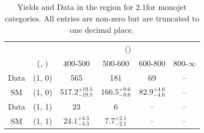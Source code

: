 \begin{table}[h!]
\tiny
\centering
\caption{Yields and Data in the \gj region for 2.1\ifb for monojet categories. All entries are non-zero but are truncated to one decimal place.\label{tab:yieldsall_gj_comb_mono}}
\begin{tabular}
{cccccc}
	\hline\hline
	&	& \multicolumn{4}{c}{\scalht (\gev)}\\ 
	&	 (\njet, \nb) & 400-500 & 500-600 & 600-800 & 800-$\infty$ \\ [0.8ex] 
\hline
	Data & (1, 0) & 565 & 181 & 69 & -- \\[0.5ex] 
	SM & (1, 0) & $517.2^{+ 19.5 }_{- 19.5 }$ & $166.5^{+ 9.6 }_{- 9.6 }$ & $82.9^{+ 4.6 }_{- 4.6 }$ & -- \\[0.5ex] 
	Data & (1, 1) & 23 & 6 & -- & -- \\[0.5ex] 
	SM & (1, 1) & $24.1^{+ 4.3 }_{- 4.3 }$ & $7.7^{+ 2.1 }_{- 2.1 }$ & -- & -- \\[0.5ex] 
	\hline
	\hline
\end{tabular}
\end{table}
